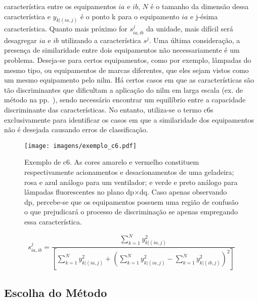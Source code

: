 \begin{itemize}
característica entre os equipamentos $ia$ e $ib$, $N$ é o tamanho da
dimensão dessa característica e $y_{k|(ia,j)}$ é o ponto k para o
equipamento $ia$ e j-ésima característica. Quanto mais próximo for
$s^j_{ia,ib}$ da unidade, mais difícil será desagregar $ia$ e $ib$
utilizando a característica $s^j$. Uma última consideração, a presença
de similaridade entre dois equipamentos não necessariamente é um
problema. Deseja-se para certos equipamentos, como por exemplo, lâmpadas
do mesmo tipo, ou equipamentos de marcas diferentes, que eles sejam
vistos como um mesmo equipamento pelo \gls{nilm}. Há certos casos em
que as características são tão discriminantes que dificultam a
aplicação do \gls{nilm} em larga escala (ex. de método na
pp.~\pageref{nilm:emi}), sendo necessário encontrar um equilíbrio entre
a capacidade discriminante das características. No entanto, utiliza-se
o termo \glspl{c6} exclusivamente para identificar os casos em que a
similaridade dos equipamentos não é desejada causando erros de
classificação.
\end{itemize}

\begin{figure}[h!t]
\centering
\texttt{[image: imagens/exemplo\_c6.pdf]}
\caption[Exemplo de \acrfull{c6}]
{Exemplo de \acrfull{c6}. As cores amarelo e vermelho constituem
respectivamente acionamentos e desacionamentos de uma geladeira; rosa
e azul análogo para um ventilador; e verde e preto análogo para
lâmpadas fluorescentes no plano \acs{dp}$\times$\acs{dq}. Caso apenas
observando \acs{dp}, percebe-se que os equipamentos possuem uma região
de confusão o que prejudicará o processo de discriminação se apenas
empregando essa característica.}
\label{fig:exemplo_c6}
\end{figure}

\begin{equation}\label{eq:similaridade}
s^j_{ia,ib} = \dfrac{
\sum^N_{k=1}y^2_{k|(ia,j)}}{
\left[\sum^N_{k=1}y^2_{k|(ia,j)} + \left(
\sum^N_{k=1}y^2_{k|(ia,j)} - \sum^N_{k=1}y^2_{k|(ib,j)}
\right)^2
\right]
}
\end{equation}

\subsection{Escolha do Método}
\label{ssec:metodologia_generica}

